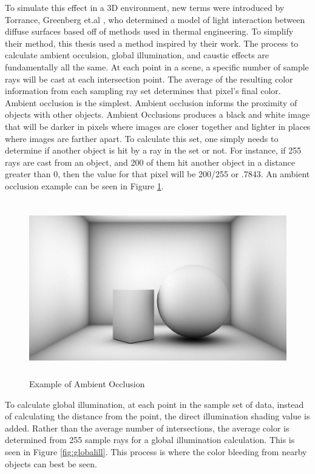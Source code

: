 To simulate this effect in a 3D environment, new terms were introduced by Torrance, Greenberg et.al \cite{Goral:1984}, who determined a model of light interaction between diffuse surfaces based off of methods used in thermal engineering.  To simplify their method, this thesis used a method inspired by their work.  The process to calculate ambient occulsion, global illumination, and caustic effects are fundamentally all the same.  At each point in a scene, a specific number of sample rays will be cast at each intersection point.  The average of the resulting color information from each sampling ray set determines that pixel's final color.  Ambient occlusion is the simplest.  Ambient occlusion informs the proximity of objects with other objects.  Ambient Occlusions produces a black and white image that will be darker in pixels where images are closer together and lighter in places where images are farther apart.  To calculate this set, one simply needs to determine if another object is hit by a ray in the set or not.  For instance, if 255 rays are cast from an object, and 200 of them hit another object in a distance greater than 0, then the value for that pixel will be 200/255 or .7843.  An ambient occlusion example can be seen in Figure \ref{fig:aOcclusion}.

\begin{figure}[h]
\centering
\includegraphics[height=3.0in]{figures/aOcclusion.jpg}
\caption{Example of Ambient Occlusion}
\label{fig:aOcclusion}
\end{figure}

To calculate global illumination, at each point in the sample set of data, instead of calculating the distance from the point, the direct illumination shading value is added.  Rather than the average number of intersections, the average color is determined from 255 sample rays for a global illumination calculation.  This is seen in Figure \ref{fig:globalill}.  This process is where the color bleeding from nearby objects can best be seen.

